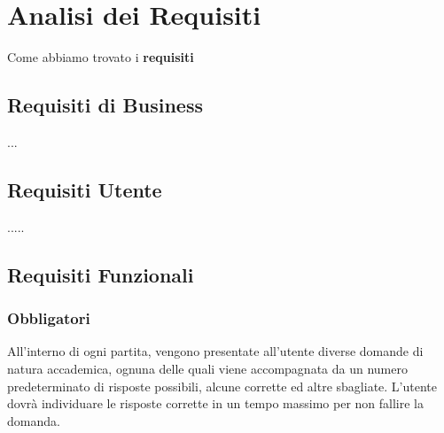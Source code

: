 

\chapter{Analisi dei Requisiti}
Come abbiamo trovato i \textbf{requisiti}
	\section{Requisiti di Business}
	...
	
	\section{Requisiti Utente}
	.....
	    
	\section{Requisiti Funzionali} 
        \subsection{Obbligatori}
        All’interno di ogni partita, vengono presentate all’utente diverse domande di natura accademica, ognuna delle quali viene accompagnata da un numero predeterminato di risposte possibili, alcune corrette ed altre sbagliate. L’utente dovrà individuare le risposte corrette in un tempo massimo per non fallire la domanda. 


